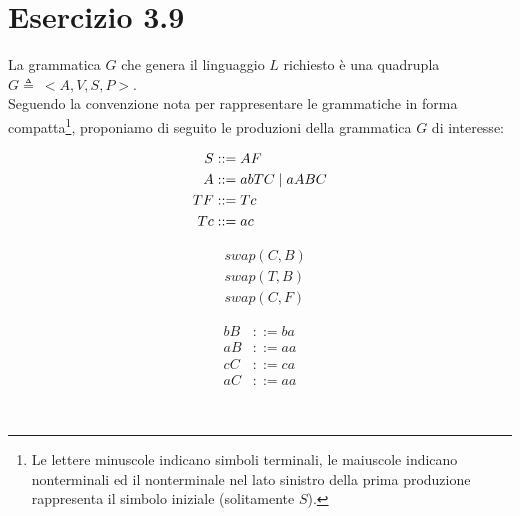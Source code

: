 \section*{Esercizio 3.9}

    
    La grammatica $G$ che genera il linguaggio $L$ richiesto è una quadrupla $G \triangleq \ <A,V,S,P>$.\\
    Seguendo la convenzione nota per rappresentare le grammatiche in forma compatta\footnote{Le lettere minuscole indicano simboli terminali, le maiuscole indicano nonterminali ed il nonterminale nel lato sinistro della prima produzione rappresenta il simbolo iniziale (solitamente $S$).}, proponiamo di seguito le produzioni della grammatica $G$ di interesse:

    \begin{minipage}{0.33\textwidth}
        \begin{align}
            S &::= AF\\
            A &::= abTC \;|\; aABC\\
            TF &::= Tc \label{eq:TF::=Tc}\\
            Tc &::= ac \label{eq:Tc::=ac}
        \end{align}
    \end{minipage}
    \begin{minipage}{0.33\textwidth}
        \begin{align}
            & swap(C,B) \label{eq:swap(C,B)}\\
            & swap(T,B) \label{eq:swap(T,B)}\\
            & swap(C,F) \label{eq:swap(C,F)}
        \end{align}
    \end{minipage}
    \begin{minipage}{0.33\textwidth}
        \begin{align}
            bB &::= ba \label{eq:bB::=ba}\\
            aB &::= aa \label{eq:aB::=aa}\\
            cC &::= ca \label{eq:cC::=ca}\\
            aC &::= aa
        \end{align}
    \end{minipage}\\
    
